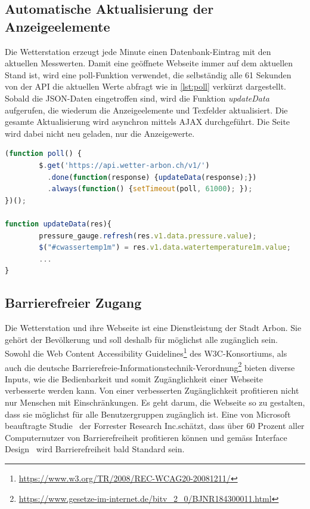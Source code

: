 \subsection{Automatische Aktualisierung der Anzeigeelemente}
\newline
Die Wetterstation erzeugt jede Minute einen Datenbank-Eintrag mit den aktuellen Messwerten. Damit eine geöffnete Webseite immer auf dem aktuellen Stand ist, wird eine poll-Funktion verwendet, die selbständig alle 61 Sekunden von der API die aktuellen Werte abfragt wie in \ref{lst:poll} verkürzt dargestellt. Sobald die JSON-Daten eingetroffen sind, wird die Funktion \textit{updateData} aufgerufen, die wiederum die Anzeigeelemente und Texfelder aktualisiert. Die gesamte Aktualisierung wird asynchron mittels AJAX durchgeführt. Die Seite wird dabei nicht neu geladen, nur die Anzeigewerte. \newline

\begin{lstlisting}[label=lst:poll,caption=Automatische Aktualisierung der Werte, language=JavaScript, style=htmlcssjs]
(function poll() {
        $.get('https://api.wetter-arbon.ch/v1/')
          .done(function(response) {updateData(response);})
          .always(function() {setTimeout(poll, 61000); });
})();

function updateData(res){
        pressure_gauge.refresh(res.v1.data.pressure.value);
        $("#cwassertemp1m") = res.v1.data.watertemperature1m.value;
        ...
}
\end{lstlisting}


\subsection{Barrierefreier Zugang}
Die Wetterstation und ihre Webseite ist eine Dienstleistung der Stadt Arbon. Sie gehört der Bevölkerung und soll deshalb für möglichst alle zugänglich sein. Sowohl die \flqq Web Content Accessibility Guidelines\frqq\footnote{ \url{https://www.w3.org/TR/2008/REC-WCAG20-20081211/}} des W3C-Konsortiums, als auch die deutsche \flqq  Barrierefreie-Informationstechnik-Verordnung\frqq\footnote{ \url{https://www.gesetze-im-internet.de/bitv_2_0/BJNR184300011.html}} bieten diverse Inputs, wie die Bedienbarkeit und somit Zugänglichkeit einer Webseite verbesserte werden kann. Von einer verbesserten Zugänglichkeit profitieren nicht nur Menschen mit Einschränkungen. Es geht darum, die Webseite so zu gestalten, dass sie möglichst für alle Benutzergruppen zugänglich ist. Eine von Microsoft beauftragte Studie~\cite{ForresterResearch2004E:Abilities} der \flqq Forrester Research Inc.\frqq schätzt, dass über 60 Prozent aller Computernutzer von Barrierefreiheit profitieren können und gemäss \flqq Interface Design\frqq ~\cite{ThesmannStephan2016ID:U} wird Barrierefreiheit bald Standard sein.

